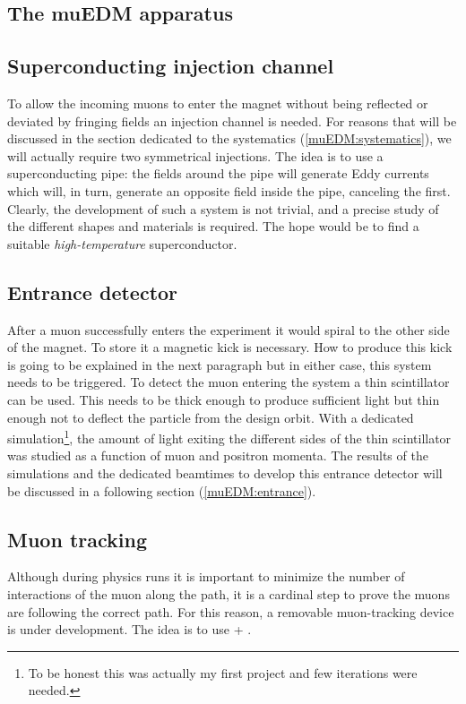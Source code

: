 \begin{refsection}
\section{The muEDM apparatus}
\subsection{Superconducting injection channel}
To allow the incoming muons to enter the magnet without being reflected or deviated by fringing fields an injection channel is needed.
For reasons that will be discussed in the section dedicated to the systematics (\ref{muEDM:systematics}), we will actually require two symmetrical injections.
The idea is to use a superconducting pipe: the fields around the pipe will generate Eddy currents which will, in turn, generate an opposite field inside the pipe, canceling the first.
Clearly, the development of such a system is not trivial, and a precise study of the different shapes and materials is required. 
The hope would be to find a suitable \textit{high-temperature} superconductor.

\subsection{Entrance detector} After a muon successfully enters the experiment it would spiral to the other side of the magnet. 
To store it a magnetic kick is necessary. 
How to produce this kick is going to be explained in the next paragraph but in either case, this system needs to be triggered.
To detect the muon entering the system a thin scintillator can be used.
This needs to be thick enough to produce sufficient light but thin enough not to deflect the particle from the design orbit.
With a dedicated \gf simulation\footnote{To be honest this was actually my first \gf project and few iterations were needed.}, the amount of light exiting the different sides of the thin scintillator was studied as a function of muon and positron momenta. 
The results of the simulations and the dedicated beamtimes to develop this entrance detector will be discussed in a following section (\ref{muEDM:entrance}).

\subsection{Muon tracking} Although during physics runs it is important to minimize the number of interactions of the muon along the path, it is a cardinal step to prove the muons are following the correct path.
For this reason, a removable muon-tracking device is under development.
The idea is to use \tpc + \grid.


\end{refsection}
